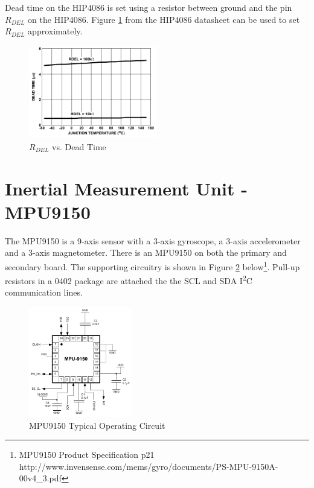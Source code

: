 \documentclass{article}
\begin{document}
Dead time on the HIP4086 is set using a resistor between ground and the pin $R_{DEL}$ on the HIP4086. Figure \ref{fig:deadtime} from the HIP4086 datasheet can be used to set $R_{DEL}$ approximately.
\begin{figure}[h]
	\centering
	\includegraphics[width=0.5\textwidth]{deadtime}
	\caption{ $R_{DEL}$ vs. Dead Time\protect\footnotemark}
	\label{fig:deadtime}
\end{figure}

\section{Inertial Measurement Unit - MPU9150}
The MPU9150 is a 9-axis sensor with a 3-axis gyroscope, a 3-axis accelerometer and a 3-axis magnetometer. There is an MPU9150 on both the primary and secondary board. The supporting circuitry is shown in Figure \ref{mpu9150} below\footnote{MPU9150 
Product Specification p21 http://www.invensense.com/mems/gyro/documents/PS-MPU-9150A-00v4\_3.pdf}. Pull-up resistors in a 0402 package are attached the the SCL and SDA I\textsuperscript{2}C communication lines. 

\begin{figure}[h!]
	\centering
	\includegraphics[width=0.4\textwidth]{mpu9150}
	\caption{MPU9150 Typical Operating Circuit}
	\label{mpu9150}
\end{figure}
\end{document}
